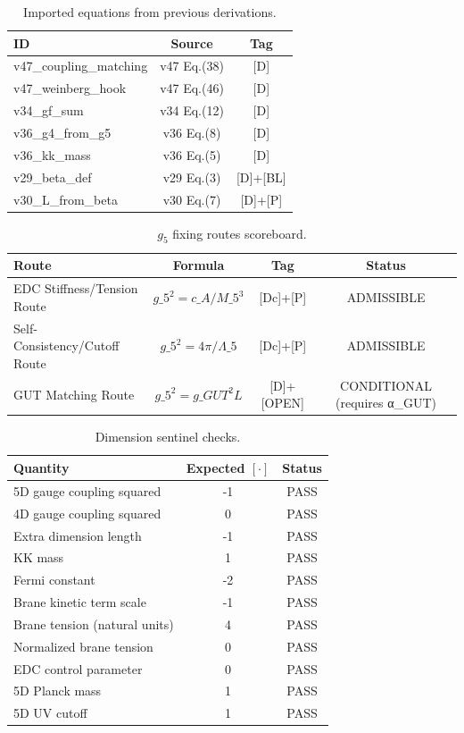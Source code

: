 \begin{table}[ht]
\centering
\caption{Imported equations from previous derivations.}
\label{tab:imported-spine}
\begin{tabular}{lcc}
\toprule
ID & Source & Tag \\
\midrule
v47\_coupling\_matching & v47 Eq.(38) & [D] \\
v47\_weinberg\_hook & v47 Eq.(46) & [D] \\
v34\_gf\_sum & v34 Eq.(12) & [D] \\
v36\_g4\_from\_g5 & v36 Eq.(8) & [D] \\
v36\_kk\_mass & v36 Eq.(5) & [D] \\
v29\_beta\_def & v29 Eq.(3) & [D]+[BL] \\
v30\_L\_from\_beta & v30 Eq.(7) & [D]+[P] \\
\bottomrule
\end{tabular}
\end{table}

\begin{table}[ht]
\centering
\caption{$g_5$ fixing routes scoreboard.}
\label{tab:g5-routes}
\begin{tabular}{lccc}
\toprule
Route & Formula & Tag & Status \\
\midrule
EDC Stiffness\slash Tension Route & $g\_5^2 = c\_A / M\_5^3$ & [Dc]+[P] & ADMISSIBLE \\
Self-Consistency\slash Cutoff Route & $g\_5^2 = 4π / Λ\_5$ & [Dc]+[P] & ADMISSIBLE \\
GUT Matching Route & $g\_5^2 = g\_GUT^2 L$ & [D]+[OPEN] & CONDITIONAL (requires α_GUT) \\
\bottomrule
\end{tabular}
\end{table}

\begin{table}[ht]
\centering
\caption{Dimension sentinel checks.}
\label{tab:dim-sentinels}
\begin{tabular}{lcc}
\toprule
Quantity & Expected $[\cdot]$ & Status \\
\midrule
5D gauge coupling squared & -1 & PASS \\
4D gauge coupling squared & 0 & PASS \\
Extra dimension length & -1 & PASS \\
KK mass & 1 & PASS \\
Fermi constant & -2 & PASS \\
Brane kinetic term scale & -1 & PASS \\
Brane tension (natural units) & 4 & PASS \\
Normalized brane tension & 0 & PASS \\
EDC control parameter & 0 & PASS \\
5D Planck mass & 1 & PASS \\
5D UV cutoff & 1 & PASS \\
\bottomrule
\end{tabular}
\end{table}


